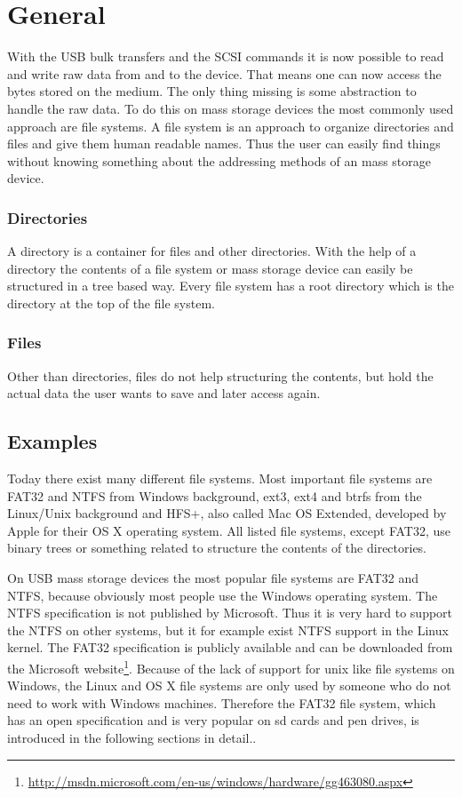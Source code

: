 \section{General}

With the USB bulk transfers and the SCSI commands it is now possible to read and write raw data from and to the device. That means one can now access the bytes stored on the medium. The only thing missing is some abstraction to handle the raw data. To do this on mass storage devices the most commonly used approach are file systems. A file system is an approach to organize directories and files and give them human readable names. Thus the user can easily find things without knowing something about the addressing methods of an mass storage device.

\subsubsection{Directories}

A directory is a container for files and other directories. With the help of a directory the contents of a file system or mass storage device can easily be structured in a tree based way. Every file system has a root directory which is the directory at the top of the file system.

\subsubsection{Files}

Other than directories, files do not help structuring the contents, but hold the actual data the user wants to save and later access again.

\subsection{Examples}

Today there exist many different file systems. Most important file systems are FAT32 and NTFS from Windows background, ext3, ext4 and btrfs from the Linux/Unix background and HFS+, also called Mac OS Extended, developed by Apple for their OS X operating system. All listed file systems, except FAT32, use binary trees or something related to structure the contents of the directories.

On USB mass storage devices the most popular file systems are FAT32 and NTFS, because obviously most people use the Windows operating system. The NTFS specification is not published by Microsoft. Thus it is very hard to support the NTFS on other systems, but it for example exist NTFS support in the Linux kernel. The FAT32 specification is publicly available and can be downloaded from the Microsoft website\footnote{\url{http://msdn.microsoft.com/en-us/windows/hardware/gg463080.aspx}}. Because of the lack of support for unix like file systems on Windows, the Linux and OS X file systems are only used by someone who do not need to work with Windows machines. Therefore the FAT32 file system, which has an open specification and is very popular on sd cards and pen drives, is introduced in the following sections in detail..


